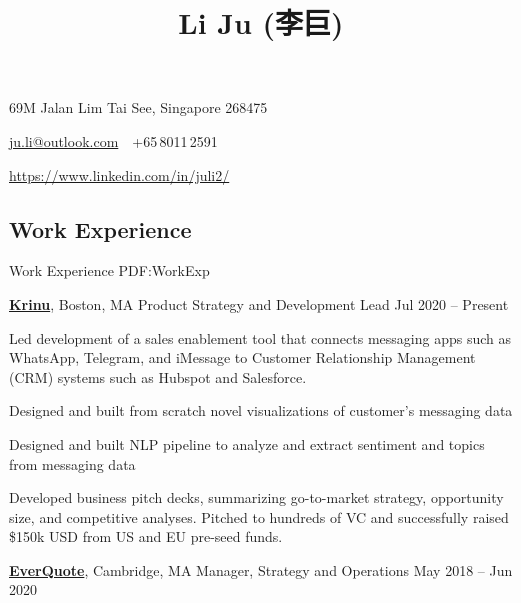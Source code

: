 \documentclass[letterpaper,10pt,oneside]{article}
\newcommand{\CVAuthor}{Li Ju (李巨)}
\begin{document}

\title{\CVAuthor}

\begin{subtitle}
\vspace{0.7em}
69M Jalan Lim Tai See, Singapore 268475
\par
\href{mailto:ju.li@outlook.com}
{ju.li@outlook.com}
\,\SubBulletSymbol\,
+65\,8011\,2591
\par 
\href{https://www.linkedin.com/in/juli2/}{https://www.linkedin.com/in/juli2/}
\end{subtitle}

\begin{body}


\section
{Work\newline
Experience}
{Work Experience}
{PDF:WorkExp}

\href{https://krinu.com/}
{\textbf{Krinu}},
Boston, MA 
\GapNoBreak
Product Strategy and Development Lead
\hfill
Jul 2020 -- Present
\begin{flushleft}

\BulletItem Led development of a sales enablement tool that connects messaging apps such as WhatsApp, Telegram, and iMessage to Customer Relationship Management (CRM) systems such as Hubspot and Salesforce. 

\vspace{0.3em} \SubBulletItem Designed and built from scratch novel visualizations of customer's messaging data

\vspace{0.3em} \SubBulletItem Designed and built NLP pipeline to analyze and extract sentiment and topics from messaging data

\vspace{0.75em}
\BulletItem Developed business pitch decks, summarizing go-to-market strategy, opportunity size, and competitive analyses. Pitched to hundreds of VC and successfully raised \$150k USD from US and EU pre-seed funds. 

\end{flushleft}


\href{http://www.everquote.com/}
{\textbf{EverQuote}},
Cambridge, MA
\GapNoBreak
Manager, Strategy and Operations
\hfill
May 2018 -- Jun 2020
\begin{flushleft}


\end{flushleft}
\end{body}
\end{document}
